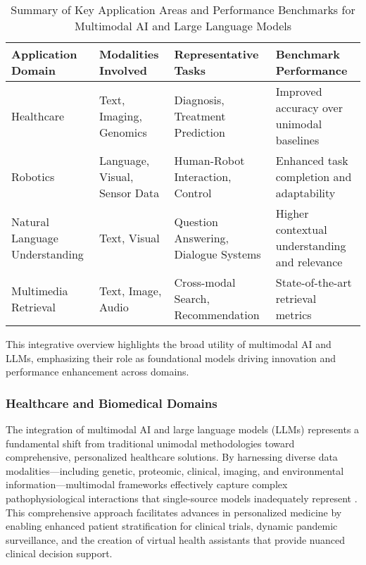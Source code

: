 \documentclass[sigconf]{acmart}
\begin{document}
\begin{table*}[htbp]
\centering
\caption{Summary of Key Application Areas and Performance Benchmarks for Multimodal AI and Large Language Models}
\label{tab:applications_benchmarks}
\begin{adjustbox}{max width=\textwidth}
\begin{tabular}{@{}llll@{}}
\toprule
Application Domain & Modalities Involved & Representative Tasks & Benchmark Performance \\
\midrule
Healthcare & Text, Imaging, Genomics & Diagnosis, Treatment Prediction & Improved accuracy over unimodal baselines \\
Robotics & Language, Visual, Sensor Data & Human-Robot Interaction, Control & Enhanced task completion and adaptability \\
Natural Language Understanding & Text, Visual & Question Answering, Dialogue Systems & Higher contextual understanding and relevance \\
Multimedia Retrieval & Text, Image, Audio & Cross-modal Search, Recommendation & State-of-the-art retrieval metrics \\
\bottomrule
\end{tabular}
\end{adjustbox}
\end{table*}

This integrative overview highlights the broad utility of multimodal AI and LLMs, emphasizing their role as foundational models driving innovation and performance enhancement across domains.

\subsubsection{Healthcare and Biomedical Domains}

The integration of multimodal AI and large language models (LLMs) represents a fundamental shift from traditional unimodal methodologies toward comprehensive, personalized healthcare solutions. By harnessing diverse data modalities—including genetic, proteomic, clinical, imaging, and environmental information—multimodal frameworks effectively capture complex pathophysiological interactions that single-source models inadequately represent \cite{ref12}. This comprehensive approach facilitates advances in personalized medicine by enabling enhanced patient stratification for clinical trials, dynamic pandemic surveillance, and the creation of virtual health assistants that provide nuanced clinical decision support.
\end{document}
